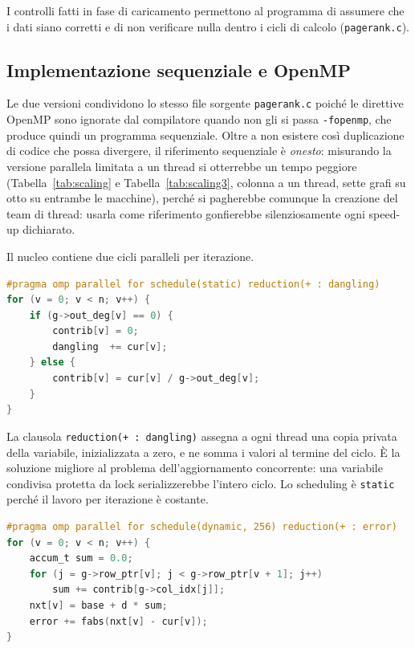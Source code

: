 \documentclass[11pt,a4paper]{article}
\newcommand{\stacco}{\par\medskip\noindent}
\begin{document}
\stacco
I controlli fatti in fase di caricamento permettono al programma di assumere
che i dati siano corretti e di non verificare nulla dentro i cicli di calcolo
(\texttt{pagerank.c}).

\subsection{Implementazione sequenziale e OpenMP}
\label{sec:omp}

Le due versioni condividono lo stesso file sorgente \texttt{pagerank.c} poiché le
direttive OpenMP sono ignorate dal compilatore quando non gli si passa
\texttt{-fopenmp}, che produce quindi un programma sequenziale. Oltre a non
esistere così duplicazione di codice che possa divergere,
il riferimento sequenziale è \emph{onesto}: misurando la versione parallela
limitata a un thread si otterrebbe un tempo peggiore
(Tabella~\ref{tab:scaling} e Tabella~\ref{tab:scaling3}, colonna
a un thread, sette grafi su
otto su entrambe le macchine), perché si pagherebbe
comunque la creazione del team di thread: usarla come riferimento
gonfierebbe silenziosamente ogni speed-up dichiarato.

\stacco
Il nucleo contiene due cicli paralleli per iterazione.

\begin{lstlisting}[language=C,caption={Calcolo dei contributi e massa dangling.}]
#pragma omp parallel for schedule(static) reduction(+ : dangling)
for (v = 0; v < n; v++) {
    if (g->out_deg[v] == 0) {
        contrib[v] = 0;
        dangling  += cur[v];
    } else {
        contrib[v] = cur[v] / g->out_deg[v];
    }
}
\end{lstlisting}

\stacco
La clausola \texttt{reduction(+ : dangling)} assegna a ogni thread una copia
privata della variabile, inizializzata a zero, e ne somma i valori al
termine del ciclo. È la soluzione migliore al problema
dell'aggiornamento concorrente: una variabile condivisa protetta da lock
serializzerebbe l'intero ciclo. Lo scheduling è \texttt{static} perché il
lavoro per iterazione è costante.

\begin{lstlisting}[language=C,caption={Accumulo dai predecessori (CSR).}]
#pragma omp parallel for schedule(dynamic, 256) reduction(+ : error)
for (v = 0; v < n; v++) {
    accum_t sum = 0.0;
    for (j = g->row_ptr[v]; j < g->row_ptr[v + 1]; j++)
        sum += contrib[g->col_idx[j]];
    nxt[v] = base + d * sum;
    error += fabs(nxt[v] - cur[v]);
}
\end{lstlisting}
\end{document}
